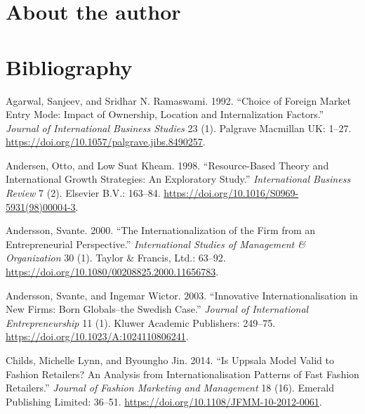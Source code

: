 \documentclass[12pt,a4paper]{article}
\begin{document}
\pagebreak

\hypertarget{about-the-author}{%
\section*{About the author}\label{about-the-author}}

\pagebreak

\hypertarget{bibliography}{%
\section*{Bibliography}\label{bibliography}}

\hypertarget{refs}{}
\leavevmode\hypertarget{ref-innovative4}{}%
Agarwal, Sanjeev, and Sridhar N. Ramaswami. 1992. ``Choice of Foreign
Market Entry Mode: Impact of Ownership, Location and Internalization
Factors.'' \emph{Journal of International Business Studies} 23 (1).
Palgrave Macmillan UK: 1--27.
\url{https://doi.org/10.1057/palgrave.jibs.8490257}.

\leavevmode\hypertarget{ref-innovative5}{}%
Andersen, Otto, and Low Suat Kheam. 1998. ``Resource-Based Theory and
International Growth Strategies: An Exploratory Study.''
\emph{International Business Review} 7 (2). Elsevier B.V.: 163--84.
\url{https://doi.org/10.1016/S0969-5931(98)00004-3}.

\leavevmode\hypertarget{ref-innovative1}{}%
Andersson, Svante. 2000. ``The Internationalization of the Firm from an
Entrepreneurial Perspective.'' \emph{International Studies of Management
\& Organization} 30 (1). Taylor \& Francis, Ltd.: 63--92.
\url{https://doi.org/10.1080/00208825.2000.11656783}.

\leavevmode\hypertarget{ref-innovativeInternationalisation}{}%
Andersson, Svante, and Ingemar Wictor. 2003. ``Innovative
Internationalisation in New Firms: Born Globals--the Swedish Case.''
\emph{Journal of International Entrepreneurship} 11 (1). Kluwer Academic
Publishers: 249--75. \url{https://doi.org/10.1023/A:1024110806241}.

\leavevmode\hypertarget{ref-innovative7}{}%
Childs, Michelle Lynn, and Byoungho Jin. 2014. ``Is Uppsala Model Valid
to Fashion Retailers? An Analysis from Internationalisation Patterns of
Fast Fashion Retailers.'' \emph{Journal of Fashion Marketing and
Management} 18 (16). Emerald Publishing Limited: 36--51.
\url{https://doi.org/10.1108/JFMM-10-2012-0061}.
\end{document}
